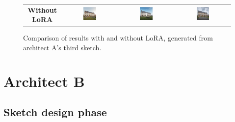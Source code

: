 \begin{figure}[H]
{\begin{tabular}{c c c c}
    \textbf{Without LoRA} & \includegraphics[width=0.25\textwidth]{Images/Results/Architect-A_unstructured-phase/generated_images/3/Zonder_lora_00019_.png} & \includegraphics[width=0.25\textwidth]{Images/Results/Architect-A_unstructured-phase/generated_images/3/Zonder_lora_00023_.png} & \includegraphics[width=0.25\textwidth]{Images/Results/Architect-A_unstructured-phase/generated_images/3/Zonder_lora_00026_.png} \\
  \end{tabular}
  }
  \caption{Comparison of results with and without LoRA, generated from architect A's third sketch.}
  \label{fig:A-generatedimgs-sketch3}
\end{figure}

\section{Architect B} \label{sec:results-B}
\subsection{Sketch design phase}
